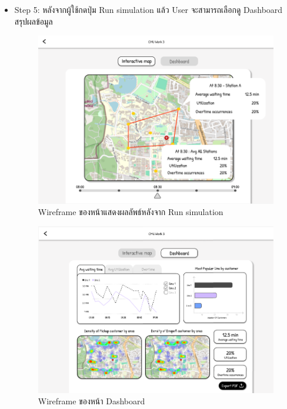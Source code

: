 \begin{mypara}
\begin{itemize}
    \item Step 5: หลังจากผู้ใช้กดปุ่ม Run simulation แล้ว User จะสามารถเลือกดู  Dashboard สรุปผลข้อมูล 
      \begin{figure}[H]
        \centering
        \includegraphics[scale=0.4]{output_show.png}
        \caption{Wireframe ของหน้าแสดงผลลัพธ์หลังจาก Run simulation}
        \label{fig:WireframeOutputLogin}
      \end{figure}

      \begin{figure}[H]
        \centering
        \includegraphics[scale=0.4]{dashboard.png}
        \caption{Wireframe ของหน้า Dashboard }
        \label{fig:WireframeDashboardLogin}
      \end{figure}
    \end{itemize}

\end{mypara}

